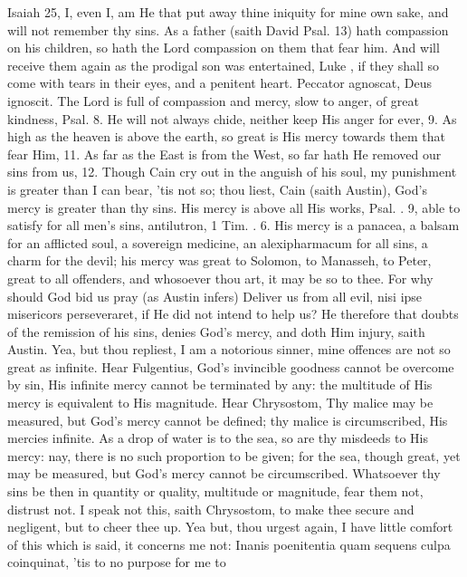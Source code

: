 {Isaiah  25, I, even I, am He that put away thine iniquity for
mine own sake, and will not remember thy sins. As a father (saith David
Psal.  13) hath compassion on his children, so hath the Lord
compassion on them that fear him. And will receive them again as the
prodigal son was entertained, Luke , if they shall so come with
tears in their eyes, and a penitent heart. Peccator agnoscat, Deus
ignoscit. The Lord is full of compassion and mercy, slow to anger, of
great kindness, Psal.  8. He will not always chide, neither keep
His anger for ever, 9. As high as the heaven is above the earth, so
great is His mercy towards them that fear Him, 11. As far as the East
is from the West, so far hath He removed our sins from us, 12. Though
Cain cry out in the anguish of his soul, my punishment is greater than
I can bear, 'tis not so; thou liest, Cain (saith Austin), God's mercy
is greater than thy sins. His mercy is above all His works, Psal. .
9, able to satisfy for all men's sins, antilutron, 1 Tim. . 6. His
mercy is a panacea, a balsam for an afflicted soul, a sovereign
medicine, an alexipharmacum for all sins, a charm for the devil; his
mercy was great to Solomon, to Manasseh, to Peter, great to all
offenders, and whosoever thou art, it may be so to thee. For why should
God bid us pray (as Austin infers) Deliver us from all evil, nisi ipse
misericors perseveraret, if He did not intend to help us? He therefore
that doubts of the remission of his sins, denies God's mercy, and
doth Him injury, saith Austin. Yea, but thou repliest, I am a notorious
sinner, mine offences are not so great as infinite. Hear Fulgentius,
God's invincible goodness cannot be overcome by sin, His infinite
mercy cannot be terminated by any: the multitude of His mercy is
equivalent to His magnitude. Hear Chrysostom, Thy malice may be
measured, but God's mercy cannot be defined; thy malice is
circumscribed, His mercies infinite. As a drop of water is to the sea,
so are thy misdeeds to His mercy: nay, there is no such proportion to
be given; for the sea, though great, yet may be measured, but God's
mercy cannot be circumscribed. Whatsoever thy sins be then in quantity
or quality, multitude or magnitude, fear them not, distrust not. I
speak not this, saith Chrysostom, to make thee secure and
negligent, but to cheer thee up. Yea but, thou urgest again, I have
little comfort of this which is said, it concerns me not: Inanis
poenitentia quam sequens culpa coinquinat, 'tis to no purpose for me to
}
